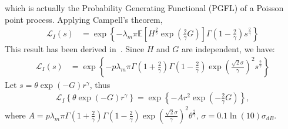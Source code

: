 which is actually the Probability Generating Functional (PGFL) of a Poisson point process.
Applying Campell's theorem, 
\begin{align}
\label{eq:laplace_trans_I}
\mathcal{L}_{I}\left( s \right) &=\exp\left\lbrace -\lambda_m \pi \mathbb{E}\left[ H^{\frac{2}{\gamma}}\exp(\frac{2}{\gamma}G)\right] \Gamma(1-\frac{2}{\gamma})s^{\frac{2}{\gamma}}  \right\rbrace 
\end{align}
This result has been derived in~\cite[eq.3.20]{haenggi2009interference}. Since $H$ and $G$ are independent, we have: 
\begin{align}
\mathcal{L}_{I}\left( s \right) &= \exp\left\lbrace -p\lambda_m \pi \Gamma(1+\frac{2}{\gamma}) \Gamma(1-\frac{2}{\gamma}) \exp \left( \frac{\sqrt{2}\sigma}{\gamma}\right) ^2 s^{\frac{2}{\gamma}}  \right\rbrace
\end{align}
Let $s=\theta \exp(-G) r^{\gamma}$, thus
\begin{align}
\label{eq:conditional_lp_trans}
\mathcal{L}_{I}\left\lbrace \theta \exp(-G) r^{\gamma}\right\rbrace = \exp\left\lbrace -A r^2\exp(-\frac{2}{\gamma}G)\right\rbrace ,
\end{align}
where $A=p\lambda_m\pi \Gamma(1+\frac{2}{\gamma}) \Gamma(1-\frac{2}{\gamma}) \exp \left( \frac{\sqrt{2}\sigma}{\gamma}\right) ^2 \theta^{\frac{2}{\gamma}}$, $\sigma = 0.1\ln(10)\sigma_{dB}$.

